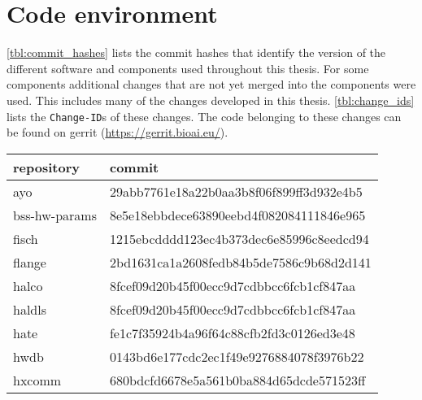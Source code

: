\documentclass[10.5pt,a4paper,DIV=15]{scrartcl}
\renewcommand\footnote[1]{}
\begin{document}
\pagebreak
\appendix

\section{Code environment}
\autoref{tbl:commit_hashes} lists the commit hashes that identify the version of the different software and \FPGA{} components used throughout this thesis. For some components additional changes that are not yet merged into the components were used. This includes many of the changes developed in this thesis. \autoref{tbl:change_ids} lists the \texttt{Change-ID}s of these changes. The code belonging to these changes can be found on gerrit (\url{https://gerrit.bioai.eu/}).
\begin{table}[H]
\centering\begin{tabular}{l >{\ttfamily}l}
\toprule{}
repository & commit \\
\midrule{}ayo & 29abb7761e18a22b0aa3b8f06f899ff3d932e4b5 \\

bss-hw-params\footnote{\url{https://github.com/electronicvisions/bss-hw-params}} & 8e5e18ebbdece63890eebd4f082084111846e965 \\

fisch\footnote{\url{https://github.com/electronicvisions/bss-hw-params}} & 1215ebcdddd123ec4b373dec6e85996c8eedcd94  \\

flange\footnote{\url{https://github.com/electronicvisions/flange}} & 2bd1631ca1a2608fedb84b5de7586c9b68d2d141 \\

halco\footnote{\url{https://github.com/electronicvisions/halco}} & 8fcef09d20b45f00ecc9d7cdbbcc6fcb1cf847aa \\

haldls\footnote{\url{https://github.com/electronicvisions/haldls}} & 8fcef09d20b45f00ecc9d7cdbbcc6fcb1cf847aa \\

hate\footnote{\url{https://github.com/electronicvisions/hate}} & fe1c7f35924b4a96f64c88cfb2fd3c0126ed3e48 \\

hwdb\footnote{\url{https://github.com/electronicvisions/hwdb}} & 0143bd6e177cdc2ec1f49e9276884078f3976b22 \\

hxcomm\footnote{\url{https://github.com/electronicvisions/hxcomm}} & 680bdcfd6678e5a561b0ba884d65dcde571523ff \\


\end{tabular}
\end{table}
\end{document}
